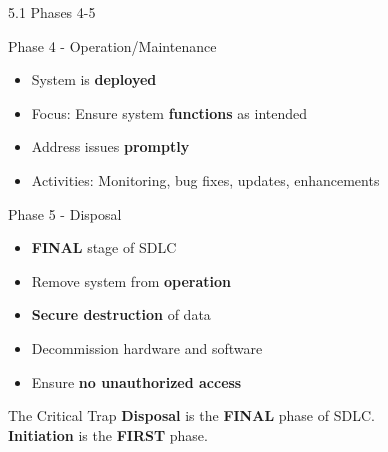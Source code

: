 \documentclass{beamer}
\begin{document}
	\begin{frame}{5.1 Phases 4-5}
		\begin{block}{Phase 4 - Operation/Maintenance}
			\begin{itemize}
				\item System is \textbf{deployed}
				\item Focus: Ensure system \textbf{functions} as intended
				\item Address issues \textbf{promptly}
				\item Activities: Monitoring, bug fixes, updates, enhancements
			\end{itemize}
		\end{block}
		
		\begin{block}{Phase 5 - Disposal}
			\begin{itemize}
				\item \textbf{FINAL} stage of SDLC
				\item Remove system from \textbf{operation}
				\item \textbf{Secure destruction} of data
				\item Decommission hardware and software
				\item Ensure \textbf{no unauthorized access}
			\end{itemize}
		\end{block}
		
		\begin{alertblock}{The Critical Trap}
			\textbf{Disposal} is the \textbf{FINAL} phase of SDLC. \\
			\textbf{Initiation} is the \textbf{FIRST} phase.
		\end{alertblock}
	\end{frame}
	
\end{document}
